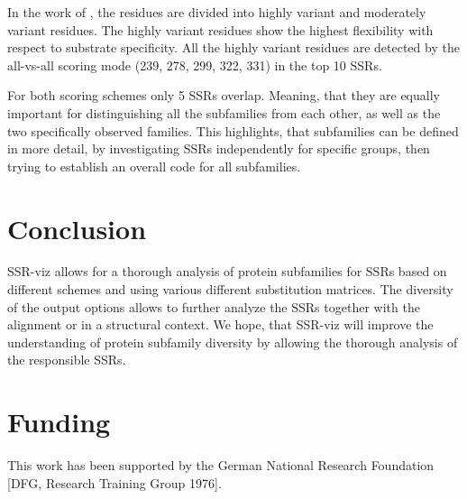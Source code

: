 \documentclass{bioinfo}
\begin{document}
In the work of \citealp{Stachelhaus01}, the residues are divided into
highly variant and moderately variant residues. 
The highly variant residues show the highest flexibility 
with respect to substrate specificity.
All the highly variant residues are detected by the all-vs-all scoring mode
(239, 278, 299, 322, 331) in the top 10 SSRs.

For both scoring schemes only 5 SSRs overlap. Meaning, that they are equally important 
for distinguishing all the subfamilies from each other, as well as the two specifically 
observed families.
This highlights, that subfamilies can be defined in more detail,
by investigating SSRs independently for specific groups, then
trying to establish an overall code for all subfamilies.%


%
%
%
\section{Conclusion}
%
SSR-viz allows for a thorough analysis of protein subfamilies for SSRs based on different schemes and using 
various different substitution matrices. %
The diversity of the output options allows to further analyze the SSRs together with the alignment or in a structural context. 
We hope, that SSR-viz will improve the understanding of protein subfamily diversity by allowing the 
thorough analysis of the responsible SSRs.
%
\section*{Funding}

This work has been supported by the German National Research Foundation [DFG, Research Training Group 1976].\vspace*{-12pt}


%
%
%
%
%
%
%
%
\end{document}
